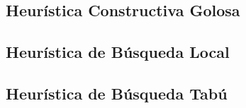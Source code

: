 \subsection{Heurística Constructiva Golosa}

\subsection{Heurística de Búsqueda Local}

\subsection{Heurística de Búsqueda Tabú}
